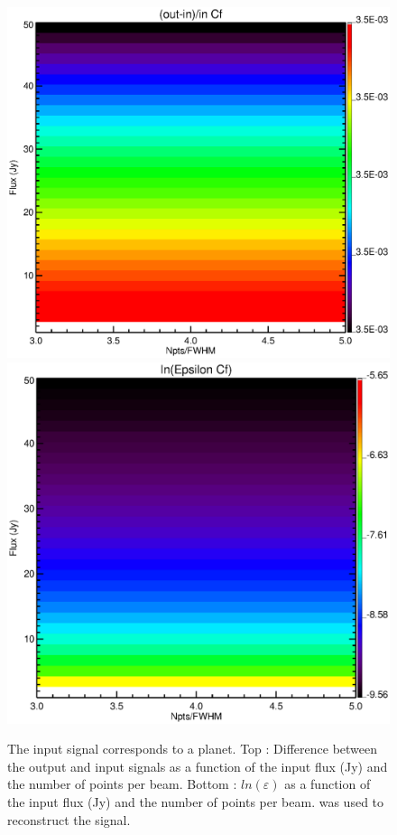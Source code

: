 \begin{figure}[h]
\center
	\includegraphics[scale=0.2]{Figures/diff_cf_planet.eps}
	\includegraphics[scale=0.2]{Figures/epsilon_cf_planet.eps}
	\caption{The input signal corresponds to a planet. Top : Difference between the output and input signals as a function of the input flux (Jy) and the number of points per beam. Bottom : $ln(\varepsilon)$ as a function of the input flux (Jy) and the number of points per beam. \cf was used to reconstruct the signal.}
	\label{fig:epsilon-cf-planet}
\end{figure}

